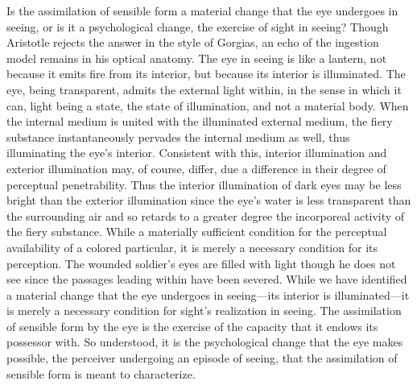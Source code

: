 Is the assimilation of sensible form a material change that the eye undergoes in seeing, or is it a psychological change, the exercise of sight in seeing? Though Aristotle rejects the answer in the style of Gorgias, an echo of the ingestion model remains in his optical anatomy. The eye in seeing is like a lantern, not because it emits fire from its interior, but because its interior is illuminated. The eye, being transparent, admits the external light within, in the sense in which it can, light being a state, the state of illumination, and not a material body. When the internal medium is united with the illuminated external medium, the fiery substance instantaneously pervades the internal medium as well, thus illuminating the eye’s interior. Consistent with this, interior illumination and exterior illumination may, of course, differ, due a difference in their degree of perceptual penetrability. Thus the interior illumination of dark eyes may be less bright than the exterior illumination since the eye's water is less transparent than the surrounding air and so retards to a greater degree the incorporeal activity of the fiery substance. While a materially sufficient condition for the perceptual availability of a colored particular, it is merely a necessary condition for its perception. The wounded soldier's eyes are filled with light though he does not see since the passages leading within have been severed. While we have identified a material change that the eye undergoes in seeing---its interior is illuminated---it is merely a necessary condition for sight's realization in seeing. The assimilation of sensible form by the eye is the exercise of the capacity that it endows its possessor with. So understood, it is the psychological change that the eye makes possible, the perceiver undergoing an episode of seeing, that the assimilation of sensible form is meant to characterize.

